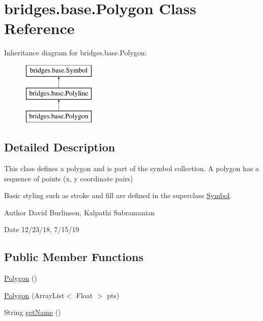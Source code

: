 \hypertarget{classbridges_1_1base_1_1_polygon}{}\section{bridges.\+base.\+Polygon Class Reference}
\label{classbridges_1_1base_1_1_polygon}
Inheritance diagram for bridges.\+base.\+Polygon\+:\begin{figure}[H]
\begin{center}
\leavevmode
\includegraphics[height=3.000000cm]{classbridges_1_1base_1_1_polygon}
\end{center}
\end{figure}


\subsection{Detailed Description}
This class defines a polygon and is part of the symbol collection. A polygon has a sequence of points (x, y coordinate pairs) 

Basic styling such as stroke and fill are defined in the superclass \hyperlink{classbridges_1_1base_1_1_symbol}{Symbol}.

\begin{DoxyAuthor}{Author}
David Burlinson, Kalpathi Subramanian 
\end{DoxyAuthor}
\begin{DoxyDate}{Date}
12/23/18, 7/15/19 
\end{DoxyDate}
\subsection*{Public Member Functions}
\begin{DoxyCompactItemize}
\item 
\hyperlink{classbridges_1_1base_1_1_polygon_af0c1b3bc3147ffbda98fd9c515a8052d}{Polygon} ()
\item 
\hyperlink{classbridges_1_1base_1_1_polygon_a341cc297ba7f0f201d31aa3c98ecf108}{Polygon} (Array\+List$<$ Float $>$ pts)
\item 
String \hyperlink{classbridges_1_1base_1_1_polygon_a2203367acb1a26dfa1a81d69ce61274f}{get\+Name} ()
\end{DoxyCompactItemize}
